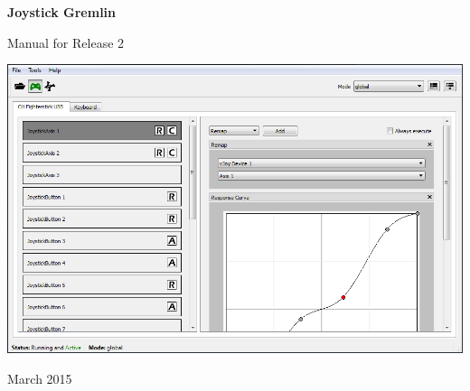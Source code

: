 \begin{titlepage}
\begin{center}
	\vspace*{\fill}
	\vspace*{-3cm}
    \begin{Huge}
        \textbf{Joystick Gremlin}
    \end{Huge}

    \vspace{1cm}

    \begin{Large}
        {Manual for Release 2}
    \end{Large}

    \vspace{3cm}

    \includegraphics[width=0.9\linewidth]{images/main_screen}

    \vspace{6.0cm}

	March 2015
\vspace*{\fill}
\end{center}
\end{titlepage}
